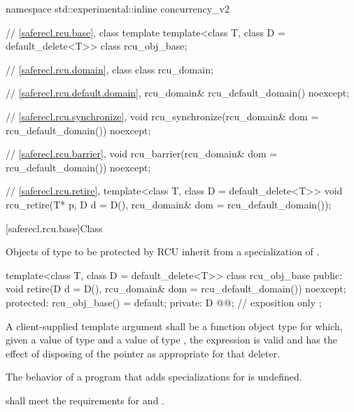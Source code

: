 \begin{codeblock}
namespace std::experimental::inline concurrency_v2 {
  // \ref{saferecl.rcu.base}, class template 
  template<class T, class D = default_delete<T>>
    class rcu_obj_base;

  // \ref{saferecl.rcu.domain}, class 
  class rcu_domain;

  // \ref{saferecl.rcu.default.domain}, 
  rcu_domain& rcu_default_domain() noexcept;

  // \ref{saferecl.rcu.synchronize}, 
  void rcu_synchronize(rcu_domain& dom = rcu_default_domain()) noexcept;

  // \ref{saferecl.rcu.barrier}, 
  void rcu_barrier(rcu_domain& dom = rcu_default_domain()) noexcept;

  // \ref{saferecl.rcu.retire}, 
  template<class T, class D = default_delete<T>>
    void rcu_retire(T* p, D d = D(), rcu_domain& dom = rcu_default_domain());
}
\end{codeblock}

[saferecl.rcu.base]{Class }


Objects of type  to be protected by RCU inherit from a
specialization of .


\begin{codeblock}
template<class T, class D = default_delete<T>>
class rcu_obj_base {
public:
  void retire(D d = D(), rcu_domain& dom = rcu_default_domain()) noexcept;
protected:
  rcu_obj_base() = default;
private:
  D @@;            // exposition only
};
\end{codeblock}

\pnum
A client-supplied template argument  shall be a
function object type  for which,
given a value  of type  and a value 
of type , the expression  is valid and
has the effect of disposing of the pointer as appropriate for
that deleter.

\pnum
The behavior of a program that adds specializations for
 is undefined.

\pnum
{} shall meet the requirements for
 and .

